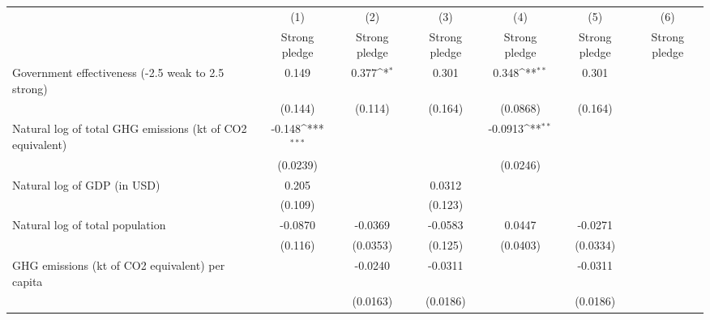 {
\def\sym#1{\ifmmode^{#1}\else\(^{#1}\)\fi}
\begin{tabular}{l*{6}{c}}
\hline\hline
                    &\multicolumn{1}{c}{(1)}&\multicolumn{1}{c}{(2)}&\multicolumn{1}{c}{(3)}&\multicolumn{1}{c}{(4)}&\multicolumn{1}{c}{(5)}&\multicolumn{1}{c}{(6)}\\
                    &\multicolumn{1}{c}{Strong pledge}&\multicolumn{1}{c}{Strong pledge}&\multicolumn{1}{c}{Strong pledge}&\multicolumn{1}{c}{Strong pledge}&\multicolumn{1}{c}{Strong pledge}&\multicolumn{1}{c}{Strong pledge}\\
\hline
Government effectiveness (-2.5 weak to 2.5 strong)&       0.149         &       0.377\sym{*}  &       0.301         &       0.348\sym{**} &       0.301         &                     \\
                    &     (0.144)         &     (0.114)         &     (0.164)         &    (0.0868)         &     (0.164)         &                     \\
[1em]
Natural log of total GHG emissions (kt of CO2 equivalent)&      -0.148\sym{***}&                     &                     &     -0.0913\sym{**} &                     &                     \\
                    &    (0.0239)         &                     &                     &    (0.0246)         &                     &                     \\
[1em]
Natural log of GDP (in USD)&       0.205         &                     &      0.0312         &                     &                     &                     \\
                    &     (0.109)         &                     &     (0.123)         &                     &                     &                     \\
[1em]
Natural log of total population&     -0.0870         &     -0.0369         &     -0.0583         &      0.0447         &     -0.0271         &                     \\
                    &     (0.116)         &    (0.0353)         &     (0.125)         &    (0.0403)         &    (0.0334)         &                     \\
[1em]
GHG emissions (kt of CO2 equivalent) per capita&                     &     -0.0240         &     -0.0311         &                     &     -0.0311         &                     \\
                    &                     &    (0.0163)         &    (0.0186)         &                     &    (0.0186)         &                     \\

\end{tabular}}
